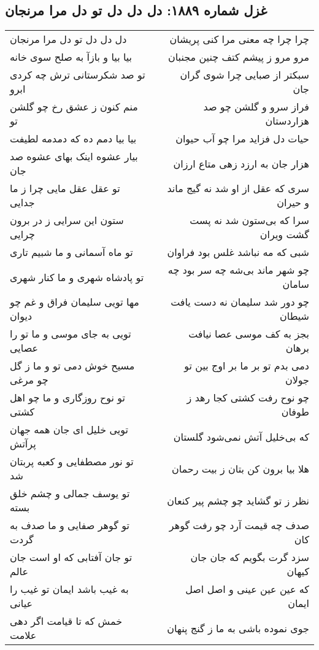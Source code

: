 \begin{center}
\section*{غزل شماره ۱۸۸۹: دل دل دل تو دل مرا مرنجان}
\label{sec:1889}
\begin{longtable}{l p{0.5cm} r}
دل دل دل تو دل مرا مرنجان
&&
چرا چرا چه معنی مرا کنی پریشان
\\
بیا بیا و بازآ به صلح سوی خانه
&&
مرو مرو ز پیشم کتف چنین مجنبان
\\
تو صد شکرستانی ترش چه کردی ابرو
&&
سبکتر از صبایی چرا شوی گران جان
\\
منم کنون ز عشق رخ چو گلشن تو
&&
فراز سرو و گلشن چو صد هزاردستان
\\
بیا بیا دمم ده که دمدمه لطیفت
&&
حیات دل فزاید مرا چو آب حیوان
\\
بیار عشوه اینک بهای عشوه صد جان
&&
هزار جان به ارزد زهی متاع ارزان
\\
تو عقل عقل مایی چرا ز ما جدایی
&&
سری که عقل از او شد نه گیج ماند و حیران
\\
ستون این سرایی ز در برون چرایی
&&
سرا که بی‌ستون شد نه پست گشت ویران
\\
تو ماه آسمانی و ما شبیم تاری
&&
شبی که مه نباشد غلس بود فراوان
\\
تو پادشاه شهری و ما کنار شهری
&&
چو شهر ماند بی‌شه چه سر بود چه سامان
\\
مها تویی سلیمان فراق و غم چو دیوان
&&
چو دور شد سلیمان نه دست یافت شیطان
\\
تویی به جای موسی و ما تو را عصایی
&&
بجز به کف موسی عصا نیافت برهان
\\
مسیح خوش دمی تو و ما ز گل چو مرغی
&&
دمی بدم تو بر ما بر اوج بین تو جولان
\\
تو نوح روزگاری و ما چو اهل کشتی
&&
چو نوح رفت کشتی کجا رهد ز طوفان
\\
تویی خلیل ای جان همه جهان پرآتش
&&
که بی‌خلیل آتش نمی‌شود گلستان
\\
تو نور مصطفایی و کعبه پربتان شد
&&
هلا بیا برون کن بتان ز بیت رحمان
\\
تو یوسف جمالی و چشم خلق بسته
&&
نظر ز تو گشاید چو چشم پیر کنعان
\\
تو گوهر صفایی و ما صدف به گردت
&&
صدف چه قیمت آرد چو رفت گوهر کان
\\
تو جان آفتابی که او است جان عالم
&&
سزد گرت بگویم که جان جان کیهان
\\
به غیب باشد ایمان تو غیب را عیانی
&&
که عین عین عینی و اصل اصل ایمان
\\
خمش که تا قیامت اگر دهی علامت
&&
جوی نموده باشی به ما ز گنج پنهان
\\
\end{longtable}
\end{center}
